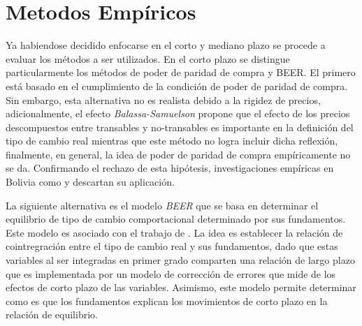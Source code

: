 \documentclass[12pt,letterpaper]{article}
\begin{document}


















\section{Metodos Empíricos}\label{tcr}

Ya habiendose decidido enfocarse en el corto y mediano plazo se procede a evaluar los métodos a ser utilizados. En el corto plazo se distingue particularmente los métodos de poder de paridad de compra y BEER. El primero está basado en el cumplimiento de la condición de poder de paridad de compra. Sin embargo, esta alternativa no es realista debido a la rigidez de precios, adicionalmente, el efecto \emph{Balassa-Samuelson} propone que el efecto de los precios descompuestos entre transables y no-transables \citep{balassa1968effective} es importante en la definición del tipo de cambio real mientras que este método no logra incluir dicha reflexión, finalmente, en general, la idea de poder de paridad de compra empíricamente no se da. Confirmando el rechazo de esta hipótesis, investigaciones empíricas en Bolivia como \cite{lora2000tipo} y \cite{humerez2005reexaminando} descartan su aplicación.

La siguiente alternativa es el modelo \emph{BEER} que se basa en determinar el equilibrio de tipo de cambio comportacional determinado por sus fundamentos. Este modelo es asociado con el trabajo de \cite{clark1999exchange}. La idea es establecer la relación de cointregración entre el tipo de cambio real y sus fundamentos, dado que estas variables al ser integradas en primer grado comparten una relación de largo plazo que es implementada por un modelo de corrección de errores que mide de los efectos de corto plazo de las variables. Asimismo, este modelo permite determinar como es que los fundamentos explican los movimientos de corto plazo en la relación de equilibrio.
\end{document}
